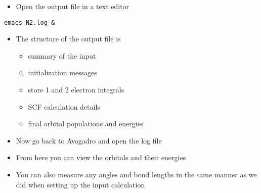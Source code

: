 \documentclass[11pt]{article}
\begin{document}
\begin{itemize}
\item Open the output file in a text editor
\end{itemize}

\begin{verbatim}
emacs N2.log &
\end{verbatim}

\begin{itemize}
\item The structure of the output file is
\begin{itemize}
\item summary of the input
\item initialization messages
\item store 1 and 2 electron integrals
\item SCF calculation details
\item final orbital populations and energies
\end{itemize}

\item Now go back to Avogadro and open the log file

\item From here you can view the orbitals and their energies

\item You can also measure any angles and bond lengths in the same manner as we did when setting up the input calculation
\end{itemize}
\end{document}
